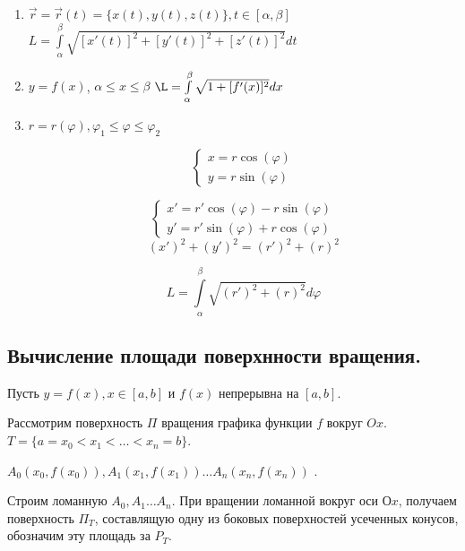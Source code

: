 \documentclass[a4paper,12pt]{article} %
\renewcommand {\leq}{\leqslant}
\begin{document}
\begin{enumerate}

    \item $\Vec{r} = \Vec{r}(t) = \{ x(t), y(t), z(t) \}, t \in [\alpha, \beta]$
    $L = \int \limits_\alpha^\beta \sqrt{[x'(t)]^2+[y'(t)]^2+[z'(t)]^2}dt$
    
    \item $y=f(x)$, $\alpha \leq x \leq \beta$
    $\L=\int\limits_\alpha^\beta \sqrt{1+[f'(x)]^2}dx$
    
    \item $r=r(\varphi), \varphi_1 \leq \varphi \leq \varphi_2$
    
    \begin{equation*}
 \begin{cases}
  x=r \cos(\varphi)
   \\
   y = r \sin(\varphi)
   
 \end{cases}
\end{equation*}

 \begin{equation*}
 \begin{cases}
  x'=r' \cos(\varphi) - r\sin(\varphi)
   \\
   y' = r' \sin(\varphi) + r\cos(\varphi)
   
 \end{cases}
\end{equation*}
\begin{equation}
  (x')^2+(y')^2=(r')^2+(r)^2  
\end{equation}

\begin{equation}
  L =\int\limits_\alpha^\beta \sqrt{(r')^2+(r)^2}d\varphi 
\end{equation}

\end{enumerate}

\subsection{Вычисление площади поверхнности вращения.}

Пусть $y = f(x), x \in [a, b]$ и $f(x)$ непрерывна на $[a, b]$.

Рассмотрим поверхность $\Pi$ вращения графика функции $f$ вокруг $Ox$. $T = \{ a = x_0 < x_1<\dots<x_n = b \}$.

$A_0 (x_0, f(x_0)), A_1 (x_1, f(x_1)) \dots A_n(x_n, f(x_n))$ .

Строим ломанную $A_0, A_1\dots A_n$. При вращении ломанной вокруг оси $Оx$, получаем поверхность $\Pi_T$, составлящую одну из боковых поверхностей усеченных конусов, обозначим эту площадь за $P_T$.
\end{document}
